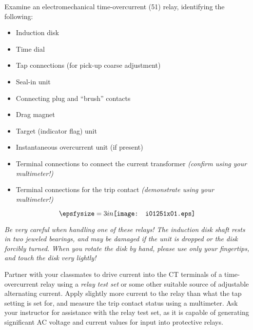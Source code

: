 

Examine an electromechanical time-overcurrent (51) relay, identifying the following:

\begin{itemize}
\item{} Induction disk
\item{} Time dial
\item{} Tap connections (for pick-up coarse adjustment)
\item{} Seal-in unit
\item{} Connecting plug and ``brush'' contacts
\item{} Drag magnet
\item{} Target (indicator flag) unit
\item{} Instantaneous overcurrent unit (if present)
\item{} Terminal connections to connect the current transformer {\it (confirm using your multimeter!)}
\item{} Terminal connections for the trip contact {\it (demonstrate using your multimeter!)}
\end{itemize}

$$\epsfysize=3in \texttt{[image: i01251x01.eps]}$$

{\it Be very careful when handling one of these relays!  The induction disk shaft rests in two jeweled bearings, and may be damaged if the unit is dropped or the disk forcibly turned.  When you rotate the disk by hand, please use only your fingertips, and touch the disk very lightly!}

\vskip 10pt

Partner with your classmates to drive current into the CT terminals of a time-overcurrent relay using a {\it relay test set} or some other suitable source of adjustable alternating current.  Apply slightly more current to the relay than what the tap setting is set for, and measure the trip contact status using a multimeter.  Ask your instructor for assistance with the relay test set, as it is capable of generating significant AC voltage and current values for input into protective relays.



